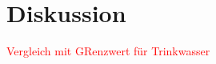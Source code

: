 \section{Diskussion}
\label{sec:diskussion}


\textcolor{red}{Vergleich mit GRenzwert für Trinkwasser}
